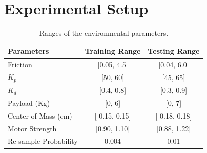 \documentclass[conference]{IEEEtran}
\begin{document}

\section{Experimental Setup}
\label{sec:experiment}

\begin{table}[t]
\begin{center}
\begin{tabular}{lcc}
\toprule
 \textbf{Parameters} & \textbf{Training Range} & \textbf{Testing Range} \\
 \midrule
 Friction & [0.05, 4.5]  & [0.04, 6.0]  \\
 $K_p$ & [50, 60] & [45, 65]  \\
 $K_d$  &  [0.4, 0.8] & [0.3, 0.9] \\
 Payload (Kg)  & [0, 6]  & [0, 7]  \\
 Center of Mass (cm)  & [-0.15, 0.15]  & [-0.18, 0.18]  \\
 Motor Strength & [0.90, 1.10]  & [0.88, 1.22]  \\
 Re-sample Probability & 0.004 & 0.01 \\
\bottomrule
\end{tabular}
\vspace{-0.05in}
\caption{\label{tab:ood-range} Ranges of the environmental parameters.}
\end{center}
\vspace{-0.3in}
\end{table}
\end{document}
